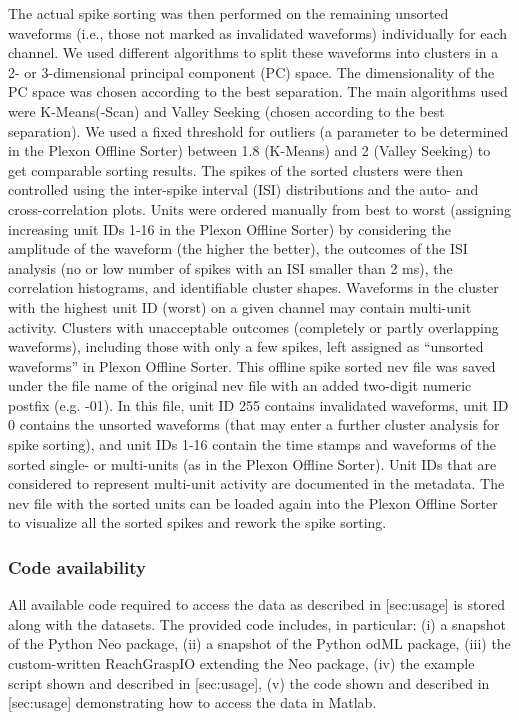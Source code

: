{The actual spike sorting was then performed on the remaining unsorted waveforms (i.e., those not marked as invalidated waveforms) individually for each channel. We used different algorithms to split these waveforms into clusters in a 2- or 3-dimensional principal component (PC) space. The dimensionality of the PC space was chosen according to the best separation. The main algorithms used were K-Means(-Scan) and Valley Seeking (chosen according to the best separation). We used a fixed threshold for outliers (a parameter to be determined in the Plexon Offline Sorter) between 1.8 (K-Means) and 2 (Valley Seeking) to get comparable sorting results. The spikes of the sorted clusters were then controlled using the inter-spike interval (ISI) distributions and the auto- and cross-correlation plots. Units were ordered manually from best to worst (assigning increasing unit IDs 1-16 in the Plexon Offline Sorter) by considering the amplitude of the waveform (the higher the better), the outcomes of the ISI analysis (no or low number of spikes with an ISI smaller than 2 ms), the correlation histograms, and identifiable cluster shapes. Waveforms in the cluster with the highest unit ID (worst) on a given channel may contain multi-unit activity. Clusters with unacceptable outcomes (completely or partly overlapping waveforms), including those with only a few spikes, left assigned as “unsorted waveforms” in Plexon Offline Sorter. This offline spike sorted nev file was saved under the file name of the original nev file with an added two-digit numeric postfix (e.g. -01). In this file, unit ID 255 contains invalidated waveforms, unit ID 0 contains the unsorted waveforms (that may enter a further cluster analysis for spike sorting), and unit IDs 1-16 contain the time stamps and waveforms of the sorted single- or multi-units (as in the Plexon Offline Sorter). Unit IDs that are considered to represent multi-unit activity are documented in the metadata. The nev file with the sorted units can be loaded again into the Plexon Offline Sorter to visualize all the sorted spikes and rework the spike sorting.

\subsubsection{Code availability}

All available code required to access the data as described in [sec:usage] is stored along with the datasets. The provided code includes, in particular: (i) a snapshot of the Python Neo package, (ii) a snapshot of the Python odML package, (iii) the custom-written ReachGraspIO extending the Neo package, (iv) the example script shown and described in [sec:usage], (v) the code shown and described in [sec:usage] demonstrating how to access the data in Matlab.

}
